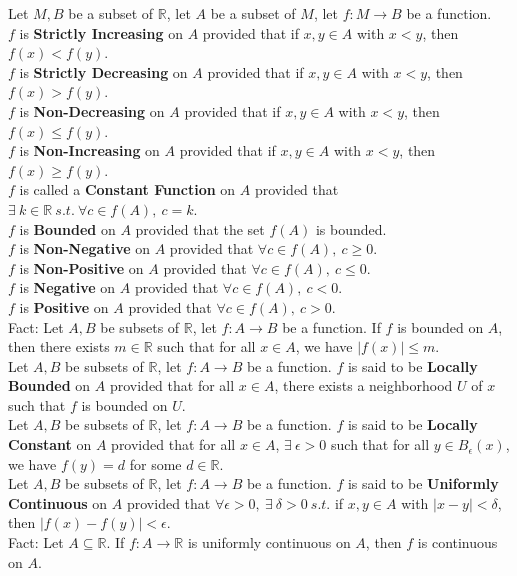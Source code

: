 \documentclass[11pt]{article}
\newcommand{\R}{\mathbb{R}}
\newcommand{\fact}{\color{gray}Fact: \color{black}}
\begin{document}
		\noindent Let $M,B$ be a subset of $\R$, let $A$ be a subset of $M$, let $f:M \to B$ be a function.\\ $f$ is \textbf{Strictly Increasing} on $A$ provided that if $x,y \in A$ with $x<y$, then $f(x)<f(y)$.\\ $f$ is \textbf{Strictly Decreasing} on $A$ provided that if $x,y \in A$ with $x<y$, then $f(x)>f(y)$.\\ $f$ is \textbf{Non-Decreasing} on $A$ provided that if $x,y \in A$ with $x<y$, then $f(x)\leq f(y)$.\\ $f$ is \textbf{Non-Increasing} on $A$ provided that if $x,y \in A$ with $x<y$, then $f(x)\geq f(y)$.\\  $f$ is called a \textbf{Constant Function} on $A$ provided that $\exists \ k \in \R \ s.t. \ \forall c \in f(A), \ c=k$.\\ $f$ is \textbf{Bounded} on $A$ provided that the set $f(A)$ is bounded.\\ $f$ is \textbf{Non-Negative} on $A$ provided that $\forall c \in f(A), \ c\geq 0$.\\ $f$ is \textbf{Non-Positive} on $A$ provided that $\forall c \in f(A), \ c\leq 0$.\\ $f$ is \textbf{Negative} on $A$ provided that $\forall c \in f(A), \ c < 0$.\\$f$ is \textbf{Positive} on $A$ provided that $\forall c \in f(A), \ c> 0$.\\
		\fact Let $A,B$ be subsets of $\R$, let $f:A \to B$ be a function. If $f$ is bounded on $A$, then there exists $m \in \R$ such that for all $x \in A$, we have $|f(x)| \leq m$.\\
		
		\noindent Let $A,B$ be subsets of $\R$, let $f:A \to B$ be a function. $f$ is said to be \textbf{Locally Bounded} on $A$ provided that for all $x \in A$, there exists a neighborhood $U$ of $x$ such that $f$ is bounded on $U$.\\ 
		
		\noindent Let $A,B$ be subsets of $\R$, let $f:A \to B$ be a function. $f$ is said to be \textbf{Locally Constant} on $A$ provided that for all $x \in A$, $ \exists \ \epsilon >0$ such that for all $y \in B_\epsilon(x)$, we have $f(y) =d $ for some $d \in \R$.\\		
		
		\noindent Let $A,B$ be subsets of $\R$, let $f:A \to B$ be a function. $f$ is said to be \textbf{Uniformly Continuous} on $A$ provided that $\forall \epsilon>0, \ \exists \ \delta>0 \ s.t.$ if $x,y \in A$ with $|x-y|<\delta$, then $|f(x)-f(y)|<\epsilon$.\\
		\fact Let $A \subseteq \R$. If $f:A \to \R$ is uniformly continuous on $A$, then $f$ is continuous on $A$.\\
\end{document}
